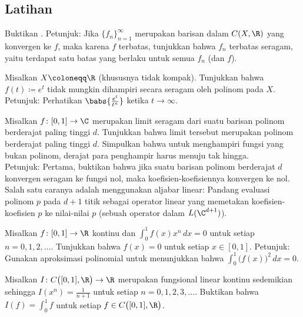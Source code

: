 \subsection{Latihan}

\begin{exercise}
Buktikan .
Petunjuk: Jika $\{ f_n \}_{n=1}^\infty$ merupakan barisan dalam $C(X,\R)$
yang konvergen ke $f$, maka karena $f$ terbatas, tunjukkan bahwa $f_n$
terbatas seragam, yaitu terdapat satu batas yang berlaku untuk semua $f_n$
(dan $f$).
\end{exercise}

\begin{exercise}
Misalkan $X \coloneqq \R$ (khususnya tidak kompak).
Tunjukkan bahwa $f(t) \coloneqq e^t$ tidak mungkin dihampiri secara seragam
oleh polinom pada $X$. Petunjuk: Perhatikan $\babs{\frac{e^t}{t^n}}$
ketika $t \to \infty$.
\end{exercise}

\begin{exercise}
Misalkan $f \colon [0,1] \to \C$ merupakan limit seragam dari suatu barisan
polinom berderajat paling tinggi $d$. Tunjukkan bahwa limit tersebut merupakan
polinom berderajat paling tinggi $d$. Simpulkan bahwa untuk menghampiri fungsi
yang bukan polinom, derajat para penghampir harus menuju tak hingga.\\
Petunjuk: Pertama, buktikan bahwa jika suatu barisan polinom berderajat $d$
konvergen seragam ke fungsi nol, maka koefisien-koefisiennya konvergen ke nol.
Salah satu caranya adalah menggunakan aljabar linear: Pandang evaluasi polinom $p$
pada $d+1$ titik sebagai operator linear yang memetakan koefisien-koefisien
$p$ ke nilai-nilai $p$ (sebuah operator dalam $L(\C^{d+1})$).
\end{exercise}

\begin{exercise}
Misalkan $f \colon [0,1] \to \R$ kontinu dan
$\int_0^1 f(x) x^n \, dx = 0$ untuk setiap $n = 0,1,2,\ldots$.
Tunjukkan bahwa $f(x) = 0$ untuk setiap $x \in [0,1]$.
Petunjuk: Gunakan aproksimasi polinomial untuk menunjukkan bahwa
$\int_0^1 {\bigl( f(x) \bigr)}^2 \, dx = 0$.
\end{exercise}

\begin{exercise}
Misalkan $I \colon C\bigl([0,1],\R\bigr) \to \R$ merupakan
fungsional linear kontinu sedemikian sehingga
$I(x^n) = \frac{1}{n+1}$
untuk setiap $n=0,1,2,3,\ldots$.
Buktikan bahwa $I(f) = \int_0^1 f$ untuk setiap
$f \in C\bigl([0,1],\R\bigr)$.
\end{exercise}

